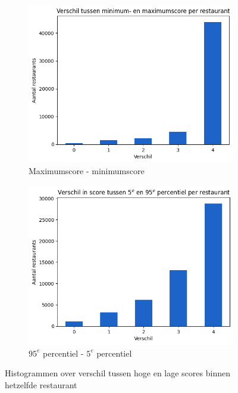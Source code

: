 \begin{figure}[H]
    \begin{subfigure}{.5\textwidth}
        \centering
        \includegraphics[width=1\linewidth]{fig/chapt3/verdeling_score_min_max_restaurant.png}
        \caption{Maximumscore - minimumscore}
        \label{fig:chapt3_verdeling_score_min_max_restaurant}
    \end{subfigure}
    \begin{subfigure}{.5\textwidth}
        \centering
        \includegraphics[width=1\linewidth]{fig/chapt3/verdeling_score_min_max_percentiel_restaurant.png}
        \caption{$95^e$ percentiel - $5^e$ percentiel}
        \label{fig:chapt3_verdeling_score_min_max_percentiel_restaurant}
    \end{subfigure}
    \caption{Histogrammen over verschil tussen hoge en lage scores binnen hetzelfde restaurant}
    \label{fig:chapt3_verdeling_score_min_max_combined_restaurants}
\end{figure}

